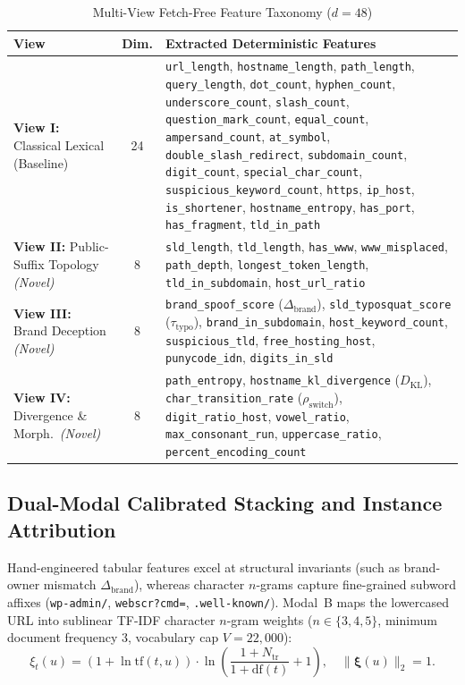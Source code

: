 \documentclass[conference]{IEEEtran}
\begin{document}
\begin{table}[t]
\caption{Multi-View Fetch-Free Feature Taxonomy ($d = 48$)}
\label{tab:features48}
\centering
\scriptsize
\renewcommand{\arraystretch}{1.12}
\begin{tabular}{p{1.55cm}cp{5.25cm}}
\toprule
\textbf{View} & \textbf{Dim.} & \textbf{Extracted Deterministic Features} \\
\midrule
\textbf{View I:} Classical Lexical (Baseline) & 24 & \texttt{url\_length}, \texttt{hostname\_length}, \texttt{path\_length}, \texttt{query\_length}, \texttt{dot\_count}, \texttt{hyphen\_count}, \texttt{underscore\_count}, \texttt{slash\_count}, \texttt{question\_mark\_count}, \texttt{equal\_count}, \texttt{ampersand\_count}, \texttt{at\_symbol}, \texttt{double\_slash\_redirect}, \texttt{subdomain\_count}, \texttt{digit\_count}, \texttt{special\_char\_count}, \texttt{suspicious\_keyword\_count}, \texttt{https}, \texttt{ip\_host}, \texttt{is\_shortener}, \texttt{hostname\_entropy}, \texttt{has\_port}, \texttt{has\_fragment}, \texttt{tld\_in\_path} \\
\midrule
\textbf{View II:} Public-Suffix Topology \emph{(Novel)} & 8 & \texttt{sld\_length}, \texttt{tld\_length}, \texttt{has\_www}, \texttt{www\_misplaced}, \texttt{path\_depth}, \texttt{longest\_token\_length}, \texttt{tld\_in\_subdomain}, \texttt{host\_url\_ratio} \\
\midrule
\textbf{View III:} Brand Deception \emph{(Novel)} & 8 & \texttt{brand\_spoof\_score} ($\Delta_{\text{brand}}$), \texttt{sld\_typosquat\_score} ($\tau_{\text{typo}}$), \texttt{brand\_in\_subdomain}, \texttt{host\_keyword\_count}, \texttt{suspicious\_tld}, \texttt{free\_hosting\_host}, \texttt{punycode\_idn}, \texttt{digits\_in\_sld} \\
\midrule
\textbf{View IV:} Divergence \& Morph.\ \emph{(Novel)} & 8 & \texttt{path\_entropy}, \texttt{hostname\_kl\_divergence} ($D_{\text{KL}}$), \texttt{char\_transition\_rate} ($\rho_{\text{switch}}$), \texttt{digit\_ratio\_host}, \texttt{vowel\_ratio}, \texttt{max\_consonant\_run}, \texttt{uppercase\_ratio}, \texttt{percent\_encoding\_count} \\
\bottomrule
\end{tabular}
\end{table}

\subsection{Dual-Modal Calibrated Stacking and Instance Attribution}
\label{sec:stack}
Hand-engineered tabular features excel at structural invariants (such as brand-owner mismatch $\Delta_{\text{brand}}$), whereas character $n$-grams capture fine-grained subword affixes (\texttt{wp-admin/}, \texttt{webscr?cmd=}, \texttt{.well-known/}). Modal~B maps the lowercased URL into sublinear TF-IDF character $n$-gram weights ($n \in \{3,4,5\}$, minimum document frequency $3$, vocabulary cap $V=22{,}000$):
\begin{equation}
\xi_t(u) = \left(1 + \ln \text{tf}(t, u)\right) \cdot \ln\!\left(\frac{1 + N_{\text{tr}}}{1 + \text{df}(t)} + 1\right), \quad \|\boldsymbol{\xi}(u)\|_2 = 1.
\label{eq:tfidf}
\end{equation}
\end{document}
